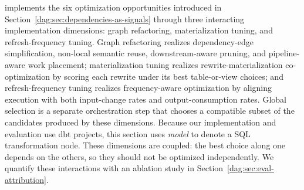 
\dagsmith{} implements the six optimization opportunities introduced in Section~\ref{dag:sec:dependencies-as-signals} through three interacting implementation dimensions: graph refactoring, materialization tuning, and refresh-frequency tuning. Graph refactoring realizes dependency-edge simplification, non-local semantic reuse, downstream-aware pruning, and pipeline-aware work placement; materialization tuning realizes rewrite-materialization co-optimization by scoring each rewrite under its best table-or-view choices; and refresh-frequency tuning realizes frequency-aware optimization by aligning execution with both input-change rates and output-consumption rates. Global selection is a separate orchestration step that chooses a compatible subset of the candidates produced by these dimensions. Because our implementation and evaluation use dbt projects, this section uses \emph{model} to denote a SQL transformation node.
These dimensions are coupled: the best choice along one depends on the others, so they should not be optimized independently. We quantify these interactions with an ablation study in Section~\ref{dag:sec:eval-attribution}.

